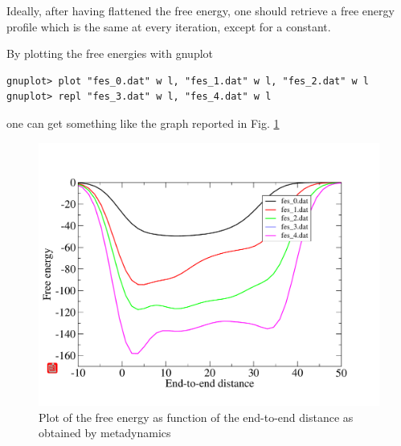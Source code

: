 \documentclass[10pt,fleqn,a4paper]{report}
\begin{document}
Ideally, after having flattened the free energy, one should retrieve a free energy profile which is the same at every iteration, except for a constant.

By plotting the free energies with gnuplot
\begin{verbatim}
gnuplot> plot "fes_0.dat" w l, "fes_1.dat" w l, "fes_2.dat" w l
gnuplot> repl "fes_3.dat" w l, "fes_4.dat" w l
\end{verbatim}
one can get something like the graph reported in Fig. \ref{free_ene}

\begin{figure}[h!]
\begin{center}
\includegraphics[width=15cm,angle=0]{./figures/free_energy}
\caption{Plot of the free energy as function of the end-to-end distance as obtained by metadynamics}
\label{free_ene}
\end{center}
\end{figure} 
\end{document}

